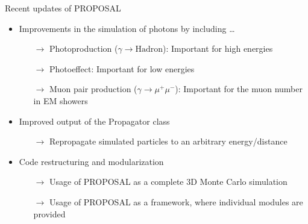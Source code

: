 \documentclass[t]{beamer}
\newlength{\itemseparation}
\begin{document}
\begin{columns}[onlytextwidth]
\begin{column}{0.45\textwidth}
\begin{block}[equal height group=F]{Recent updates of PROPOSAL}
\begin{figure}
\begin{tikzpicture}[scale=2.5, every node/.style={scale=1.0}]
            \end{tikzpicture}
        \end{figure} 
        \begin{itemize}
          \setlength\itemsep{\itemseparation}
          \item Improvements in the simulation of photons by including \dots
          \begin{itemize}
            \setlength\itemsep{\itemseparation}
            \item[$\rightarrow$] Photoproduction ($\gamma \rightarrow \text{Hadron}$): Important for high energies
            \item[$\rightarrow$] Photoeffect: Important for low energies
            \item[$\rightarrow$] Muon pair production ($\gamma \rightarrow \mu^+ \mu^-$): Important for the muon number in EM showers
          \end{itemize}
          \item Improved output of the Propagator class
          \begin{itemize}
            \setlength\itemsep{\itemseparation}
            \item[$\rightarrow$] Repropagate simulated particles to an arbitrary energy/distance
          \end{itemize}
          \item Code restructuring and modularization
          \begin{itemize}
            \setlength\itemsep{\itemseparation}
            \item[$\rightarrow$] Usage of PROPOSAL as a complete 3D Monte Carlo simulation
            \item[$\rightarrow$] Usage of PROPOSAL as a framework, where individual modules are provided
          \end{itemize}
        \end{itemize}
      \end{block}%
    \end{column}%
  \end{columns}%
\end{document}
